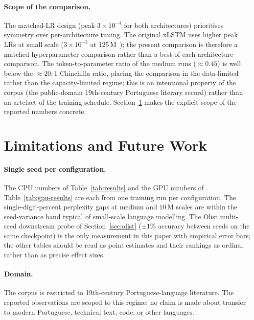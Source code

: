 \documentclass[11pt]{article}
\begin{document}
\paragraph{Scope of the comparison.}
The matched-LR design (peak $3 \times 10^{-4}$ for both architectures)
prioritises symmetry over per-architecture tuning. The original xLSTM
uses higher peak LRs at small scale
($3\times10^{-3}$ at 125\,M~\cite{beck2024}); the present comparison is
therefore a matched-hyperparameter comparison rather than a
best-of-each-architecture comparison. The token-to-parameter ratio of
the medium runs ($\approx 0.45$) is well below the $\approx 20{:}1$
Chinchilla ratio, placing the comparison in the data-limited rather than
the capacity-limited regime; this is an intentional property of
the corpus (the public-domain 19th-century Portuguese literary record)
rather than an artefact of the training schedule. Section~\ref{sec:limitations}
makes the explicit scope of the reported numbers concrete.

\section{Limitations and Future Work}\label{sec:limitations}

\paragraph{Single seed per configuration.}
The CPU numbers of Table~\ref{tab:results} and the GPU numbers of
Table~\ref{tab:gpu-results} are each from one training run per
configuration. The single-digit-percent perplexity gaps at medium and
$10$\,M scales are within the seed-variance band typical of small-scale
language modelling. The Olist multi-seed downstream probe of
Section~\ref{sec:olist} ($\pm 1\%$ accuracy between seeds on the same
checkpoint) is the only measurement in this paper with empirical error
bars; the other tables should be read as point estimates and their
rankings as ordinal rather than as precise effect sizes.

\paragraph{Domain.}
The corpus is restricted to 19th-century Portuguese-language literature.
The reported observations are scoped to this regime; no claim is made
about transfer to modern Portuguese, technical text, code, or other
languages.
\end{document}
